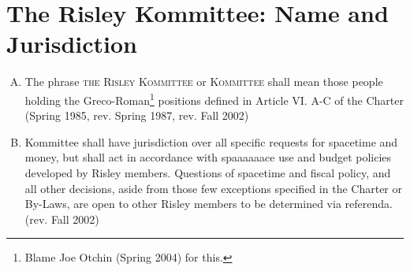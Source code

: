 \documentclass[12pt]{article}
\begin{document}
\section{The Risley Kommittee: Name and Jurisdiction}
\begin{enumerate}[A.]
\item The phrase \textsc{the Risley Kommittee} or \textsc{Kommittee} shall mean those people holding the Greco-Roman\footnote{Blame Joe Otchin (Spring 2004) for this.} positions defined in Article VI. A-C of the Charter (Spring 1985, rev. Spring 1987, rev. Fall 2002)
\item Kommittee shall have jurisdiction over all specific requests for spacetime and money, but shall act in accordance with spaaaaaace use and budget policies developed by Risley members. Questions of spacetime and fiscal policy, and all other decisions, aside from those few exceptions specified in the Charter or By-Laws, are open to other Risley members to be determined via referenda. (rev. Fall 2002)

\end{enumerate}
\end{document}
